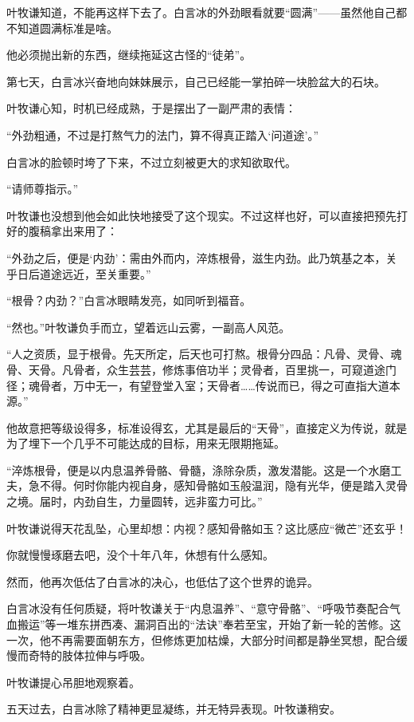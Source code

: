叶牧谦知道，不能再这样下去了。白言冰的外劲眼看就要“圆满”——虽然他自己都不知道圆满标准是啥。

他必须抛出新的东西，继续拖延这古怪的“徒弟”。

\vspace{2em}

第七天，白言冰兴奋地向妹妹展示，自己已经能一掌拍碎一块脸盆大的石块。

叶牧谦心知，时机已经成熟，于是摆出了一副严肃的表情：

“外劲粗通，不过是打熬气力的法门，算不得真正踏入‘问道途’。”

白言冰的脸顿时垮了下来，不过立刻被更大的求知欲取代。

“请师尊指示。”

叶牧谦也没想到他会如此快地接受了这个现实。不过这样也好，可以直接把预先打好的腹稿拿出来用了：

“外劲之后，便是‘内劲’：需由外而内，淬炼根骨，滋生内劲。此乃筑基之本，关乎日后道途远近，至关重要。”

“根骨？内劲？”白言冰眼睛发亮，如同听到福音。

“然也。”叶牧谦负手而立，望着远山云雾，一副高人风范。

“人之资质，显于根骨。先天所定，后天也可打熬。根骨分四品：凡骨、灵骨、魂骨、天骨。凡骨者，众生芸芸，修炼事倍功半；灵骨者，百里挑一，可窥道途门径；魂骨者，万中无一，有望登堂入室；天骨者……传说而已，得之可直指大道本源。”

他故意把等级设得多，标准设得玄，尤其是最后的“天骨”，直接定义为传说，就是为了埋下一个几乎不可能达成的目标，用来无限期拖延。

“淬炼根骨，便是以内息温养骨骼、骨髓，涤除杂质，激发潜能。这是一个水磨工夫，急不得。何时你能内视自身，感知骨骼如玉般温润，隐有光华，便是踏入灵骨之境。届时，内劲自生，力量圆转，远非蛮力可比。”

叶牧谦说得天花乱坠，心里却想：内视？感知骨骼如玉？这比感应“微芒”还玄乎！

你就慢慢琢磨去吧，没个十年八年，休想有什么感知。

然而，他再次低估了白言冰的决心，也低估了这个世界的诡异。

白言冰没有任何质疑，将叶牧谦关于“内息温养”、“意守骨骼”、“呼吸节奏配合气血搬运”等一堆东拼西凑、漏洞百出的“法诀”奉若至宝，开始了新一轮的苦修。这一次，他不再需要面朝东方，但修炼更加枯燥，大部分时间都是静坐冥想，配合缓慢而奇特的肢体拉伸与呼吸。

叶牧谦提心吊胆地观察着。

五天过去，白言冰除了精神更显凝练，并无特异表现。叶牧谦稍安。

